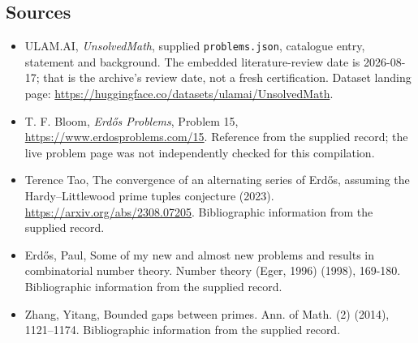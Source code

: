 \documentclass[11pt,a4paper]{article}
\begin{document}
\subsection{Sources}

{\small

\begin{itemize}

\item[\hypertarget{source:statement:1}{S1}] ULAM.AI, \emph{UnsolvedMath}, supplied \texttt{problems.json}, catalogue entry, statement and background. The embedded literature-review date is 2026-08-17; that is the archive’s review date, not a fresh certification. Dataset landing page: \url{https://huggingface.co/datasets/ulamai/UnsolvedMath}.

\item[\hypertarget{source:statement:2}{S2}] T. F. Bloom, \emph{Erdős Problems}, Problem 15, \url{https://www.erdosproblems.com/15}. Reference from the supplied record; the live problem page was not independently checked for this compilation.

\item[\hypertarget{source:statement:3}{S3}] Terence Tao, The convergence of an alternating series of Erdős, assuming the Hardy--Littlewood prime tuples conjecture (2023). \url{https://arxiv.org/abs/2308.07205}. Bibliographic information from the supplied record.

\item[\hypertarget{source:statement:4}{S4}] Erd\H{o}s, Paul, Some of my new and almost new problems and results in combinatorial number theory. Number theory (Eger, 1996) (1998), 169-180. Bibliographic information from the supplied record.

\item[\hypertarget{source:statement:5}{S5}] Zhang, Yitang, Bounded gaps between primes. Ann. of Math. (2) (2014), 1121--1174. Bibliographic information from the supplied record.

\end{itemize}

}

\label{end:statement}
\end{document}
